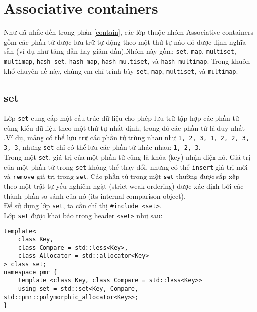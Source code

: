 \section{Associative containers}
Như đã nhắc đến trong phần \ref{contain}, các lớp thuộc nhóm Associative containers gồm các phần tử được lưu trữ tự động theo một thứ tự nào đó được định nghĩa sẵn (ví dụ như tăng dần hay giảm dần).Nhóm này gồm: \lstinline{set}, \lstinline{map}, \lstinline{multiset}, \lstinline{multimap}, \lstinline{hash_set}, \lstinline{hash_map}, \lstinline{hash_multiset}, và \lstinline{hash_multimap}. \cite{tdtfit} Trong khuôn khổ chuyên đề này, chúng em chỉ trình bày \lstinline{set}, \lstinline{map}, \lstinline{multiset}, và \lstinline{multimap}.\\
\subsection{set}
Lớp \lstinline{set} cung cấp một cấu trúc dữ liệu cho phép lưu trữ tập hợp các phần tử cùng kiểu dữ liệu theo một thứ tự nhất định, trong đó các phần tử là duy nhất .Ví dụ, mảng có thể lưu trữ các phần tử trùng nhau như \lstinline{1, 2, 3, 1, 2, 2, 3, 3, 3}, nhưng \lstinline{set} chỉ có thể lưu các phần tử khác nhau: \lstinline{1, 2, 3}.\\
Trong một \lstinline{set}, giá trị của một phần tử cũng là khóa (key) nhận diện nó. Giá trị của một phần tử trong \lstinline{set} không thể thay đổi, nhưng có thể \lstinline{insert} giá trị mới và \lstinline{remove} giá trị trong \lstinline{set}.
Các phần tử trong một \lstinline{set} thường được sắp xếp theo một trật tự yếu nghiêm ngặt (strict weak ordering) được xác định bởi các thành phần so sánh  của nó (its internal comparison object). \cite{otherset}\\
Để sử dụng lớp \lstinline{set}, ta cần chỉ thị \lstinline{#include <set>}.\\
Lớp \lstinline{set} được khai báo trong header \lstinline{<set>} như sau: \cite{set}
\begin{lstlisting}
template<
    class Key, 
    class Compare = std::less<Key>, 
    class Allocator = std::allocator<Key>
> class set;
namespace pmr {
    template <class Key, class Compare = std::less<Key>>
    using set = std::set<Key, Compare, std::pmr::polymorphic_allocator<Key>>;
}
\end{lstlisting}
